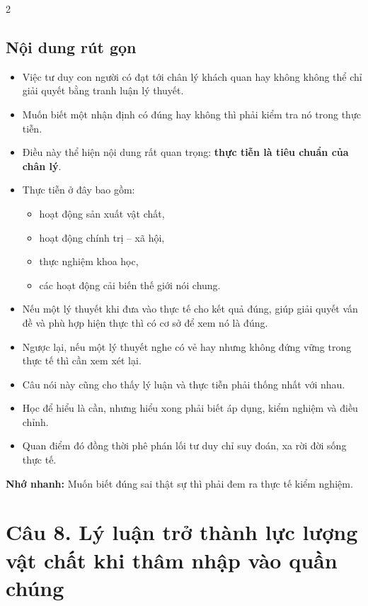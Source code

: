 \documentclass[9pt,a4paper]{extarticle}
\begin{document}
\begin{multicols*}{2}
\subsection*{Nội dung rút gọn}
\begin{itemize}
  \item Việc tư duy con người có đạt tới chân lý khách quan hay không không thể chỉ giải quyết bằng tranh luận lý thuyết.
  \item Muốn biết một nhận định có đúng hay không thì phải kiểm tra nó trong thực tiễn.
  \item Điều này thể hiện nội dung rất quan trọng: \textbf{thực tiễn là tiêu chuẩn của chân lý}.
  \item Thực tiễn ở đây bao gồm:
  \begin{itemize}
    \item hoạt động sản xuất vật chất,
    \item hoạt động chính trị -- xã hội,
    \item thực nghiệm khoa học,
    \item các hoạt động cải biến thế giới nói chung.
  \end{itemize}
  \item Nếu một lý thuyết khi đưa vào thực tế cho kết quả đúng, giúp giải quyết vấn đề và phù hợp hiện thực thì có cơ sở để xem nó là đúng.
  \item Ngược lại, nếu một lý thuyết nghe có vẻ hay nhưng không đứng vững trong thực tế thì cần xem xét lại.
  \item Câu nói này cũng cho thấy lý luận và thực tiễn phải thống nhất với nhau.
  \item Học để hiểu là cần, nhưng hiểu xong phải biết áp dụng, kiểm nghiệm và điều chỉnh.
  \item Quan điểm đó đồng thời phê phán lối tư duy chỉ suy đoán, xa rời đời sống thực tế.
\end{itemize}

\textbf{Nhớ nhanh:} Muốn biết đúng sai thật sự thì phải đem ra thực tế kiểm nghiệm.

\section*{Câu 8. Lý luận trở thành lực lượng vật chất khi thâm nhập vào quần chúng}

\end{multicols*}
\end{document}
